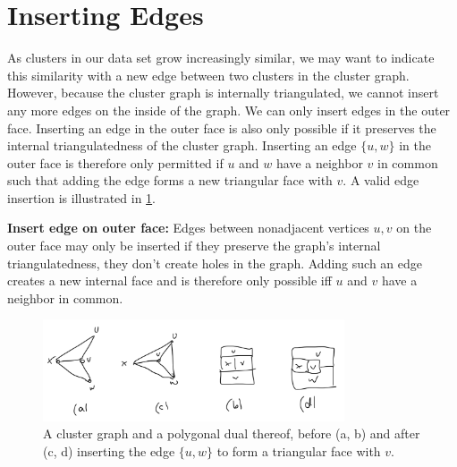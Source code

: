 \section{Inserting Edges}
\label{sect:inserting-edges}

As clusters in our data set grow increasingly similar, we may want to indicate this similarity with a new edge between two clusters in the cluster graph. However, because the cluster graph is internally triangulated, we cannot insert any more edges on the inside of the graph. We can only insert edges in the outer face. Inserting an edge in the outer face is also only possible if it preserves the internal triangulatedness of the cluster graph. Inserting an edge $\{u,w\}$ in the outer face is therefore only permitted if $u$ and $w$ have a neighbor $v$ in common such that adding the edge forms a new triangular face with $v$. A valid edge insertion is illustrated in \cref{fig:insert-edge-outside-example}.

\textbf{Insert edge on outer face:} Edges between nonadjacent vertices $u, v$ on the outer face may only be inserted if they preserve the graph's internal triangulatedness, \ie{} they don't create holes in the graph. Adding such an edge creates a new internal face and is therefore only possible iff $u$ and $v$ have a neighbor in common.

\begin{figure}[H]
	\centering
	\includegraphics[height=30mm]{Resources/InsertEdgeOutside.png}
	\caption{A cluster graph and a polygonal dual thereof, before (a, b) and after (c, d) inserting the edge $\{u,w\}$ to form a triangular face with $v$.}
	\label{fig:insert-edge-outside-example}
\end{figure}
